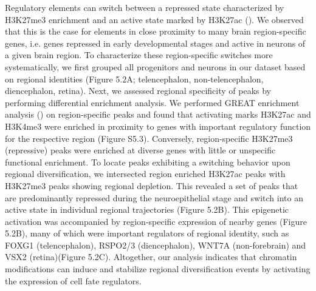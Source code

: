 Regulatory elements can switch between a repressed state characterized by H3K27me3 enrichment and an active state marked by H3K27ac (\cite{allis_molecular_2016}). We observed that this is the case for elements in close proximity to many brain region-specific genes, i.e. genes repressed in early developmental stages and active in neurons of a given brain region. To characterize these region-specific switches more systematically, we first grouped all progenitors and neurons in our dataset based on regional identities (Figure 5.2A; telencephalon, non-telencephalon, diencephalon, retina). Next, we assessed regional specificity of peaks by performing differential enrichment analysis. We performed GREAT enrichment analysis (\cite{mclean_great_2010}) on region-specific peaks and found that activating marks H3K27ac and H3K4me3 were enriched in proximity to genes with important regulatory function for the respective region (Figure S5.3). Conversely, region-specific H3K27me3 (repressive) peaks were enriched at diverse genes with little or unspecific functional enrichment. To locate peaks exhibiting a switching behavior upon regional diversification, we intersected region enriched H3K27ac peaks with H3K27me3 peaks showing regional depletion. This revealed a set of peaks that are predominantly repressed during the neuroepithelial stage and switch into an active state in individual regional trajectories (Figure 5.2B). This epigenetic activation was accompanied by region-specific expression of nearby genes (Figure 5.2B), many of which were important regulators of regional identity, such as FOXG1 (telencephalon), RSPO2/3 (diencephalon), WNT7A (non-forebrain) and VSX2 (retina)(Figure 5.2C). Altogether, our analysis indicates that chromatin modifications can induce and stabilize regional diversification events by activating the expression of cell fate regulators.


